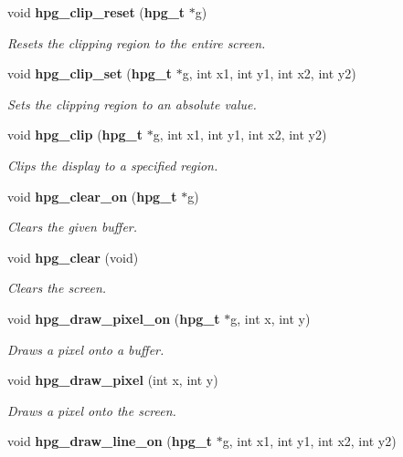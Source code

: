 \begin{CompactItemize}
void {\bf hpg\_\-clip\_\-reset} ({\bf hpg\_\-t} $\ast$g)
\begin{CompactList}\small\item\em Resets the clipping region to the entire screen.\item\end{CompactList}\item 
void {\bf hpg\_\-clip\_\-set} ({\bf hpg\_\-t} $\ast$g, int x1, int y1, int x2, int y2)
\begin{CompactList}\small\item\em Sets the clipping region to an absolute value.\item\end{CompactList}\item 
void {\bf hpg\_\-clip} ({\bf hpg\_\-t} $\ast$g, int x1, int y1, int x2, int y2)
\begin{CompactList}\small\item\em Clips the display to a specified region.\item\end{CompactList}\item 
void {\bf hpg\_\-clear\_\-on} ({\bf hpg\_\-t} $\ast$g)
\begin{CompactList}\small\item\em Clears the given buffer.\item\end{CompactList}\item 
void {\bf hpg\_\-clear} (void)
\begin{CompactList}\small\item\em Clears the screen.\item\end{CompactList}\item 
void {\bf hpg\_\-draw\_\-pixel\_\-on} ({\bf hpg\_\-t} $\ast$g, int x, int y)
\begin{CompactList}\small\item\em Draws a pixel onto a buffer.\item\end{CompactList}\item 
void {\bf hpg\_\-draw\_\-pixel} (int x, int y)
\begin{CompactList}\small\item\em Draws a pixel onto the screen.\item\end{CompactList}\item 
void {\bf hpg\_\-draw\_\-line\_\-on} ({\bf hpg\_\-t} $\ast$g, int x1, int y1, int x2, int y2)

\end{CompactItemize}

